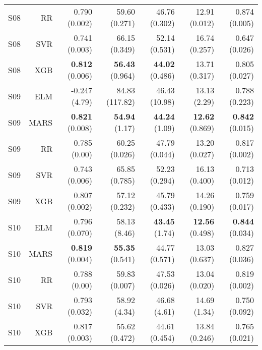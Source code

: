 \begin{table}
\begin{tabular}{rrrrrrr}
    S08 &        RR &                       0.790 (0.002) &             59.60 (0.271) &           46.76 (0.302) &           12.91 (0.012) &         0.874 (0.005) \\
    S08 &       SVR &                       0.741 (0.003) &             66.15 (0.349) &           52.14 (0.531) &           16.74 (0.257) &         0.647 (0.026) \\
    S08 &       XGB &                { \bf 0.812} (0.006) &      { \bf 56.43} (0.964) &    { \bf 44.02} (0.486) &           13.71 (0.317) &         0.805 (0.027) \\
    S09 &       ELM &                       -0.247 (4.79) &            84.83 (117.82) &           46.43 (10.98) &            13.13 (2.29) &         0.788 (0.223) \\
    S09 &      MARS &                { \bf 0.821} (0.008) &       { \bf 54.94} (1.17) &     { \bf 44.24} (1.09) &    { \bf 12.62} (0.869) &  { \bf 0.842} (0.015) \\
    S09 &        RR &                        0.785 (0.00) &             60.25 (0.026) &           47.79 (0.044) &           13.20 (0.027) &         0.817 (0.002) \\
    S09 &       SVR &                       0.743 (0.006) &             65.85 (0.785) &           52.23 (0.294) &           16.13 (0.400) &         0.713 (0.012) \\
    S09 &       XGB &                       0.807 (0.002) &             57.12 (0.232) &           45.79 (0.433) &           14.26 (0.190) &         0.759 (0.017) \\
    S10 &       ELM &                       0.796 (0.070) &              58.13 (8.46) &     { \bf 43.45} (1.74) &    { \bf 12.56} (0.498) &  { \bf 0.844} (0.034) \\
    S10 &      MARS &                { \bf 0.819} (0.004) &      { \bf 55.35} (0.541) &           44.77 (0.571) &           13.03 (0.637) &         0.827 (0.036) \\
    S10 &        RR &                        0.788 (0.00) &             59.83 (0.007) &           47.53 (0.026) &           13.04 (0.020) &         0.819 (0.002) \\
    S10 &       SVR &                       0.793 (0.032) &              58.92 (4.34) &            46.68 (4.61) &            14.69 (1.34) &         0.750 (0.092) \\
    S10 &       XGB &                       0.817 (0.003) &             55.62 (0.472) &           44.61 (0.454) &           13.84 (0.246) &         0.765 (0.021) \\

\end{tabular}
\end{table}
